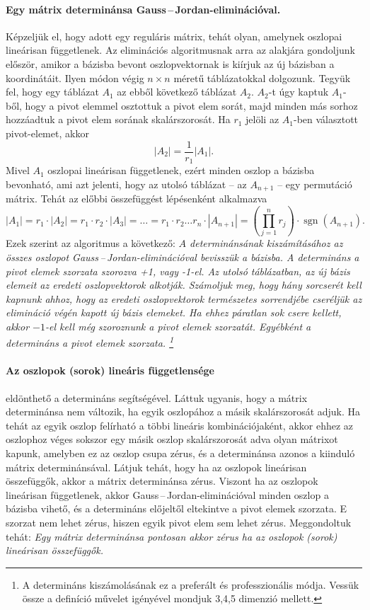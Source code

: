 \documentclass[a4paper, showtrims]{memoir}
\theoremstyle{plain}
\theoremstyle{remark}
\theoremstyle{definition}
\DeclareMathOperator{\sgn}{sgn}
\begin{document}
\paragraph{Egy mátrix determinánsa Gauss\,--\,Jordan-eliminációval.}
Képzeljük el, hogy adott egy reguláris mátrix, tehát olyan, amelynek oszlopai lineárisan függetlenek.
Az eliminációs algoritmusnak arra az alakjára gondoljunk először, amikor a bázisba bevont oszlopvektornak
is kiírjuk az új bázisban a koordinátáit.
Ilyen módon végig $n\times n$ méretű táblázatokkal dolgozunk.
Tegyük fel, hogy egy táblázat $A_1$ az ebből következő táblázat $A_2$.
$A_2$-t úgy kaptuk $A_1$-ből, hogy a pivot elemmel osztottuk a pivot elem sorát,
majd minden más sorhoz hozzáadtuk a pivot elem sorának skalárszorosát.
Ha $r_1$ jelöli az $A_1$-ben választott pivot-elemet, akkor
\[
	|A_2|=\frac{1}{r_1}|A_1|.
\]
Mivel $A_1$ oszlopai lineárisan függetlenek, ezért minden oszlop a bázisba bevonható,
ami azt jelenti, hogy az utolsó táblázat -- az $A_{n+1}$ -- egy permutáció mátrix.
Tehát az előbbi összefüggést lépésenként alkalmazva
\[
	|A_1|=r_1\cdot |A_2|=r_1\cdot r_2\cdot |A_3|=\dots=r_1\cdot r_2\dots r_{n}\cdot|A_{n+1}|=\left(\prod_{j=1}^nr_j  \right)\cdot\sgn(A_{n+1}).
\]
Ezek szerint az algoritmus a következő:
\emph{
	$A$ determinánsának kiszámításához az összes oszlopot Gauss\,--\,Jordan-eliminációval bevisszük a bázisba.
	A determináns a pivot elemek szorzata szorozva +1, vagy -1-el.
	Az utolsó táblázatban, az új bázis elemeit az eredeti oszlopvektorok alkotják.
	Számoljuk meg, hogy hány sorcserét kell kapnunk ahhoz, hogy az eredeti oszlopvektorok természetes sorrendjébe cseréljük az elimináció
	végén kapott új bázis elemeket.
	Ha ehhez páratlan sok csere kellett, akkor $-1$-el kell még szoroznunk a pivot elemek szorzatát.
	Egyébként a determináns a pivot elemek szorzata.
	\footnote{
		A determináns kiszámolásának ez a preferált és professzionális módja.
		Vessük össze a definíció művelet igényével mondjuk 3,4,5 dimenzió mellett.}
}

\paragraph{Az oszlopok (sorok) lineáris függetlensége} eldönthető a determináns segítségével.
Láttuk ugyanis, hogy a mátrix determinánsa nem változik, ha egyik oszlopához a másik skalárszorosát adjuk.
Ha tehát az egyik oszlop felírható a többi lineáris kombinációjaként,
akkor ehhez az oszlophoz véges sokszor egy másik oszlop skalárszorosát adva olyan mátrixot kapunk,
amelyben ez az oszlop csupa zérus, és a determinánsa azonos a kiinduló mátrix determinánsával.
Látjuk tehát, hogy ha az oszlopok lineárisan összefüggők, akkor a mátrix determinánsa zérus.
Viszont ha az oszlopok lineárisan függetlenek,
akkor Gauss\,--\,Jordan-eliminációval minden oszlop a bázisba vihető, és a determináns előjeltől eltekintve a pivot elemek szorzata.
E szorzat nem lehet zérus, hiszen egyik pivot elem sem lehet zérus.
Meggondoltuk tehát:
\emph{
	Egy mátrix determinánsa pontosan akkor zérus ha az oszlopok (sorok) lineárisan összefüggők.
}
\end{document}
